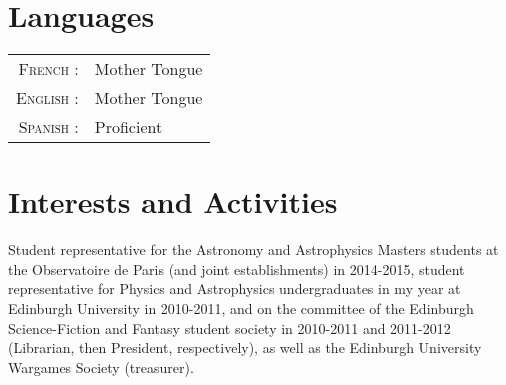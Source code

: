 \documentclass[10pt]{article} %
\begin{document}
\vspace{0.5 cm}
\section{Languages}

\begin{tabular}{rl}
\textsc{French} : & Mother Tongue \\
\textsc{English} : & Mother Tongue\\
\textsc{Spanish} : & Proficient

\end{tabular}



\vspace{0.5 cm}
\section{Interests and Activities}



Student representative for the Astronomy and Astrophysics Masters students at the Observatoire de Paris (and joint establishments) in 2014-2015, student representative for Physics and Astrophysics undergraduates in my year at Edinburgh University in 2010-2011, and on the committee of the Edinburgh Science-Fiction and Fantasy student society in 2010-2011 and 2011-2012 (Librarian, then President, respectively), as well as the Edinburgh University Wargames Society (treasurer).


\end{document}
